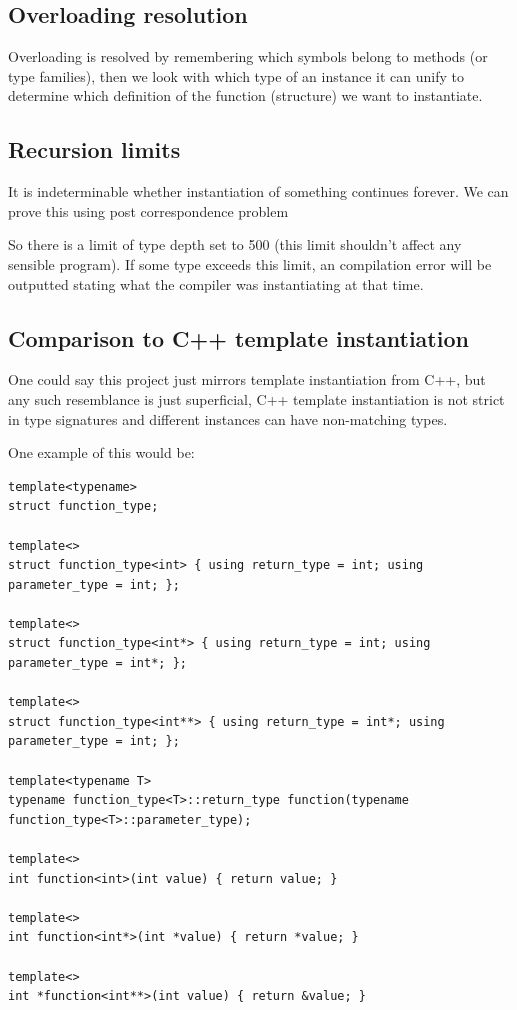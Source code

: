 \subsection{Overloading resolution}

Overloading is resolved by remembering which symbols belong to methods (or type families), then we look with which type of an
instance it can unify to determine which definition of the function (structure) we want to instantiate.

\subsection{Recursion limits}

It is indeterminable whether instantiation of something continues forever. We can prove this using post correspondence problem %

So there is a limit of type depth set to 500 (this limit shouldn't affect any sensible program).
If some type exceeds this limit, an compilation error will be outputted stating what the compiler was instantiating
at that time.

\subsection{Comparison to C++ template instantiation}

One could say this project just mirrors template instantiation from C++, but any such resemblance is just
superficial, C++ template instantiation is not strict in type signatures and different instances can have
non-matching types.

One example of this would be:

\begin{lstlisting}
template<typename>
struct function_type;

template<>
struct function_type<int> { using return_type = int; using parameter_type = int; };

template<>
struct function_type<int*> { using return_type = int; using parameter_type = int*; };

template<>
struct function_type<int**> { using return_type = int*; using parameter_type = int; };

template<typename T>
typename function_type<T>::return_type function(typename function_type<T>::parameter_type);

template<>
int function<int>(int value) { return value; }

template<>
int function<int*>(int *value) { return *value; }

template<>
int *function<int**>(int value) { return &value; }
\end{lstlisting}

